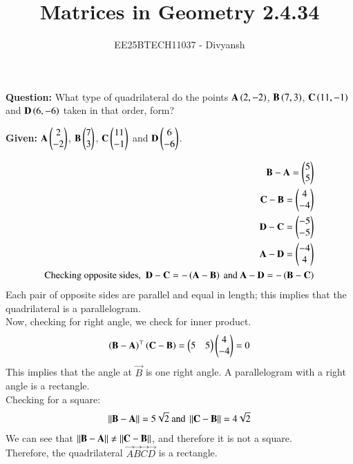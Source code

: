\documentclass[journal,12pt,onecolumn]{IEEEtran}
\title{Matrices in Geometry 2.4.34}
\author{EE25BTECH11037 - Divyansh}
\theoremstyle{remark}
\begin{document}
\vspace{3cm}
\maketitle
{\let\newpage\relax\maketitle}
\textbf{Question: }
What type of quadrilateral do the points $\mathbf{A}\left(2,-2\right)$, $\mathbf{B}\left(7,3\right)$, $\mathbf{C}\left(11,-1\right)$ and $\mathbf{D}\left(6,-6\right)$ taken in that order, form?


\textbf{Given: } $\mathbf{A}\begin{pmatrix}2\\-2\end{pmatrix}$, $\mathbf{B}\begin{pmatrix}7\\3\end{pmatrix}$, $\mathbf{C}\begin{pmatrix}11 \\ -1\end{pmatrix}$ and $\mathbf{D}\begin{pmatrix}6 \\ -6\end{pmatrix}$.
 

\begin{align}
    \vec{B}- \vec{A}=\myvec{5 \\ 5} \\
    \vec{C}- \vec{B}=\myvec{4 \\ -4} \\
    \vec{D}- \vec{C}=\myvec{-5 \\ -5} \\
    \vec{A}- \vec{D}=\myvec{-4 \\ 4} \\
    \text{Checking opposite sides, } \ \vec{D}-\vec{C}=-\brak{\vec{A}-\vec{B}} \text{ and } \vec{A}-\vec{D}=-\brak{\vec{B}-\vec{C}}
\end{align}
Each pair of opposite sides are parallel and equal in length; this implies that the quadrilateral is a parallelogram.\\
Now, checking for right angle, we check for inner product.
\begin{align}
 \left(\mathbf{B}- \mathbf{A}\right)^{\top} \left(\mathbf{C}- \mathbf{B}\right)=\begin{pmatrix}5 & 5\end{pmatrix}\begin{pmatrix}4 \\ -4\end{pmatrix}=0
\end{align}
This implies that the angle at $\vec{B}$ is one right angle. A parallelogram with a right angle is a rectangle.\\
Checking for a square:
\begin{align}
    \left\lVert\mathbf{B}- \mathbf{A}\right\rVert=5\sqrt{2} \text{ and } \left\lVert\mathbf{C}- \mathbf{B}\right\rVert=4\sqrt{2} 
\end{align}
We can see that $\left\lVert\mathbf{B}-\mathbf{A}\right\rVert \neq \left\lVert\mathbf{C}-\mathbf{B}\right\rVert$, and therefore it is not a square.\\
Therefore, the quadrilateral $\vec{A}\vec{B}\vec{C}\vec{D}$ is a rectangle.
\end{document}
